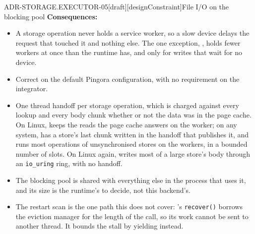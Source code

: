 \begin{requirement}{ADR-STORAGE.EXECUTOR-05}[draft][designConstraint]{File I/O on the blocking pool}
  \textbf{Consequences:}
  \begin{itemize}
    \item[+] A storage operation never holds a service worker, so a slow
      device delays the request that touched it and nothing else. The one
      exception, , holds fewer workers at
      once than the runtime has, and only for writes that wait for no
      device.
    \item[+] Correct on the default Pingora configuration, with no requirement
      on the integrator.
    \item[--] One thread handoff per storage operation, which is charged
      against every lookup and every body chunk whether or not the data was
      in the page cache. On Linux,  keeps
      the reads the page cache answers on the worker; on any system,
       has a store's last chunk written in
      the handoff that publishes it, and
       runs most operations of
      unsynchronised stores on the workers, in a bounded number of slots.
      On Linux again,  writes most of a large
      store's body through an \texttt{io\_uring} ring, with no handoff.
    \item[--] The blocking pool is shared with everything else in the process
      that uses it, and its size is the runtime's to decide, not this
      backend's.
    \item[--] The restart scan is the one path this does not cover:
      's \texttt{recover()} borrows the
      eviction manager for the length of the call, so its work cannot be sent
      to another thread. It bounds the stall by yielding instead.
  \end{itemize}



\end{requirement}

